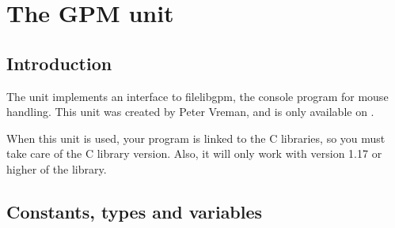 %
%
%
%
%
\chapter{The GPM unit}
\section{Introduction}
The  unit implements an interface to file{libgpm}, the console
program for mouse handling. This unit was created by Peter Vreman, and 
is only available on \linux.

When this unit is used, your program is linked to the C libraries, so
you must take care of the C library version. Also, it will only work with
version 1.17 or higher of the  library.

\section{Constants, types and variables}
